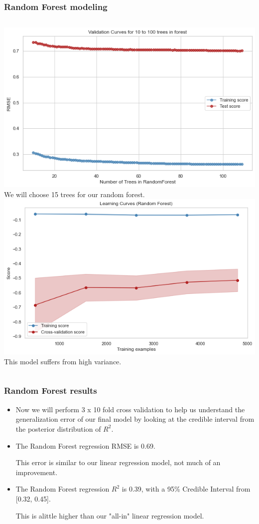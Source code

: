 \documentclass{beamer}
\begin{document}
			\begin{frame}
	\frametitle{ Random Forest modeling }
			\begin{columns}
		\includegraphics[width=1.\textwidth]{images/rf validation curves.png}
		We will choose 15 trees for our random forest.
		\includegraphics[width=1.\textwidth]{images/rf learning curves.png}
		This model suffers from high variance.
	\end{columns}
	\end{frame}
	
	\begin{frame}
		\frametitle{ Random Forest results }
			\begin{itemize}
			\item Now we will perform 3 x 10 fold cross validation to help us understand the generalization error of our final model by looking at the credible interval from the posterior distribution of $R^2$.  \par
			\item The Random Forest regression RMSE is 0.69.  \par
			This error is similar to our linear regression model, not much of an improvement.  \par
			\item The Random Forest regression $R^2$ is 0.39, with a 95\% Credible Interval from [0.32, 0.45].  \par 
			This is alittle higher than our "all-in" linear regression model.  
		\end{itemize}
	\end{frame}
	
\end{document}
